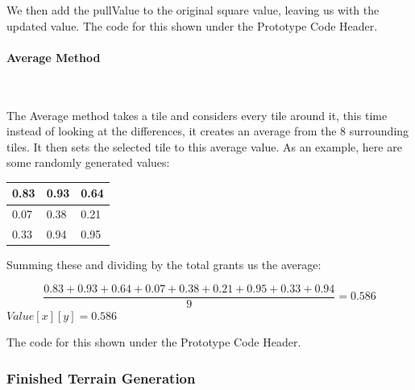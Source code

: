 \begin{flushleft}
            \vspace{0.5cm}

            We then add the pullValue to the original square value, leaving us with the updated value. The code for 
            this shown under the Prototype Code Header.
            \vspace{0.5cm}

            \paragraph{Average Method} \mbox{} \\
            \vspace{0.25cm}

            The Average method takes a tile and considers every tile around it, this time instead of looking at the
            differences, it creates an average from the 8 surrounding tiles. It then sets the selected tile to this
            average value. As an example, here are some randomly generated values:

            \begin{center}
                \begin{tabular}{| C{0.75cm} | C{0.75cm} | C{0.75cm} |}
                     & 0.93 & 0.64 \\ [0.75cm]
                     & 0.38 & 0.21 \\ [0.75cm]
                     & 0.94 & 0.95 \\ [0.75cm]
                    \hline
                \end{tabular}
                \vspace{0.25cm}

                Summing these and dividing by the total grants us the average:

                \[
                \frac{0.83 + 0.93 + 0.64 + 0.07 + 0.38 + 0.21 + 0.95 + 0.33 + 0.94}{9} = 0.586
                \]
                $Value[x][y] = 0.586$
            \end{center}
            \vspace{0.25cm}

            The code for this shown under the Prototype Code Header.

            \vspace{1cm}
            \subsubsection{Finished Terrain Generation}
            \vspace{0.25cm}


\end{flushleft}
